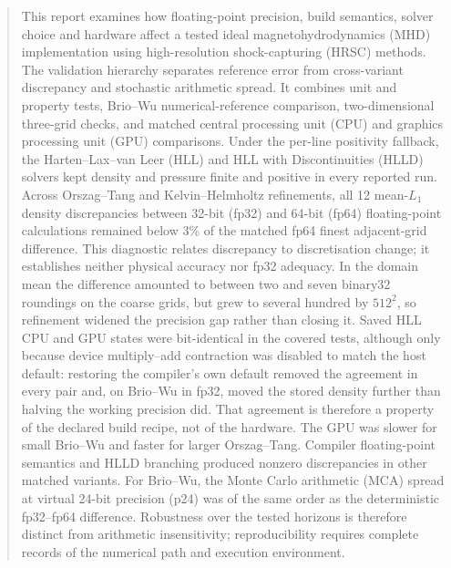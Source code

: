 \begin{abstract}
This report examines how floating-point precision, build semantics, solver
choice and hardware affect a tested ideal magnetohydrodynamics (MHD)
implementation using high-resolution shock-capturing (HRSC) methods. The
validation hierarchy separates reference error from cross-variant discrepancy
and stochastic arithmetic spread. It combines unit and property tests,
Brio--Wu numerical-reference comparison, two-dimensional three-grid checks, and
matched central processing unit (CPU) and graphics processing unit (GPU)
comparisons. Under the per-line positivity fallback, the Harten--Lax--van Leer
(HLL) and HLL with Discontinuities (HLLD) solvers kept density and pressure
finite and positive in every reported run. Across Orszag--Tang and
Kelvin--Helmholtz refinements, all 12
mean-$L_1$ density discrepancies between 32-bit (fp32) and 64-bit (fp64)
floating-point calculations remained below 3\% of the matched fp64 finest
adjacent-grid difference. This diagnostic relates discrepancy to discretisation
change; it establishes neither physical accuracy nor fp32 adequacy. In the
domain mean the difference amounted to between two and seven binary32
roundings on the coarse grids, but grew to several hundred by $512^2$, so
refinement widened the precision gap rather than closing it. Saved HLL CPU
and GPU states were bit-identical in the covered tests, although only because
device multiply--add contraction was disabled to match the host default:
restoring the compiler's own default removed the agreement in every pair and,
on Brio--Wu in fp32, moved the stored density further than halving the working
precision did. That agreement is therefore a property of the declared build
recipe, not of the hardware. The GPU was slower for small Brio--Wu and faster for larger
Orszag--Tang. Compiler floating-point semantics and HLLD branching produced
nonzero discrepancies in other matched variants. For Brio--Wu, the Monte Carlo
arithmetic (MCA) spread at virtual 24-bit precision (p24) was of the same order
as the deterministic fp32--fp64 difference. Robustness over the tested horizons
is therefore distinct from arithmetic insensitivity; reproducibility requires
complete records of the numerical path and execution environment.
\end{abstract}
